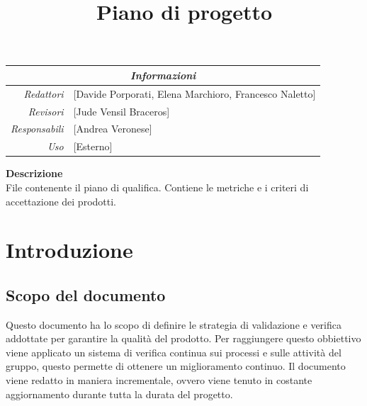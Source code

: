 \documentclass[12pt]{article}
\begin{document}
\graphicspath{ {../templates/img/} {./img}}

\title{Piano di progetto}

\firstPage



\maketitle

\begin{center}
	\begin{tabular}{r | l}
		\multicolumn{2}{c}{\textit{Informazioni}}                         \\
		\hline

		\textit{Redattori}    &
		[Davide Porporati, Elena Marchioro, Francesco Naletto]\makecell{} \\

		\textit{Revisori}     &
		[Jude Vensil Braceros]\makecell{}                                 \\
		\textit{Responsabili} &
		[Andrea Veronese]\makecell{}                                      \\
		\textit{Uso}          &
		[Esterno]\makecell{}                                              \\
	\end{tabular}
\end{center}

\begin{center}
	\textbf{Descrizione}\\
	File contenente il piano di qualifica. Contiene le metriche e i criteri di accettazione dei prodotti.
\end{center}

\pagebreak

\tableofcontents
\pagebreak

\printindex

\makeversioni

\section{Introduzione}
\subsection{Scopo del documento}
Questo documento ha lo scopo di definire le strategia di validazione e verifica addottate per garantire la qualità del prodotto.
Per raggiungere questo obbiettivo viene applicato un sistema di verifica continua sui processi e sulle attività del gruppo, questo permette di ottenere un miglioramento continuo.
Il documento viene redatto in maniera incrementale, ovvero viene tenuto in costante aggiornamento durante tutta la durata del progetto.
\end{document}
